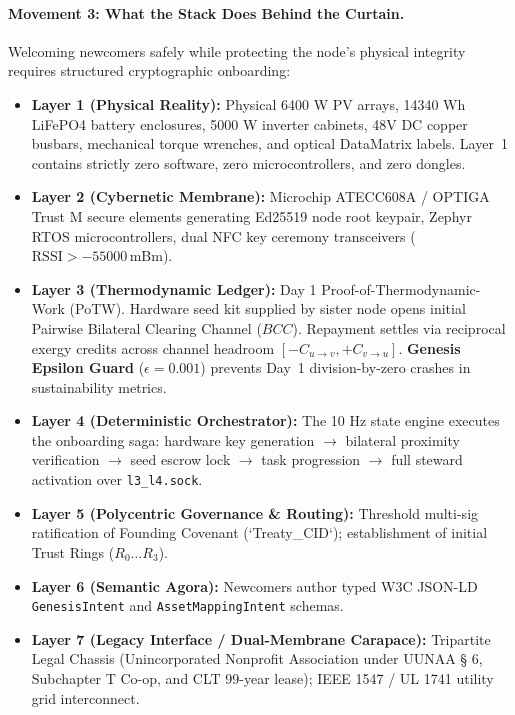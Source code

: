 \paragraph{Movement 3: What the Stack Does Behind the Curtain.}
Welcoming newcomers safely while protecting the node's physical integrity requires structured cryptographic onboarding:
\begin{itemize}
    \item \textbf{Layer 1 (Physical Reality):} Physical 6400 W PV arrays, 14340 Wh LiFePO4 battery enclosures, 5000 W inverter cabinets, 48V DC copper busbars, mechanical torque wrenches, and optical DataMatrix labels. Layer~1 contains strictly zero software, zero microcontrollers, and zero dongles.
    \item \textbf{Layer 2 (Cybernetic Membrane):} Microchip ATECC608A / OPTIGA Trust M secure elements generating Ed25519 node root keypair, Zephyr RTOS microcontrollers, dual NFC key ceremony transceivers ($\mathrm{RSSI} > -55000\,\mathrm{mBm}$).
    \item \textbf{Layer 3 (Thermodynamic Ledger):} Day 1 Proof-of-Thermodynamic-Work (PoTW). Hardware seed kit supplied by sister node opens initial Pairwise Bilateral Clearing Channel ($BCC$). Repayment settles via reciprocal exergy credits across channel headroom $[-C_{u \to v}, +C_{v \to u}]$. \textbf{Genesis Epsilon Guard} ($\epsilon = 0.001$) prevents Day~1 division-by-zero crashes in sustainability metrics.
    \item \textbf{Layer 4 (Deterministic Orchestrator):} The 10 Hz state engine executes the onboarding saga: hardware key generation $\to$ bilateral proximity verification $\to$ seed escrow lock $\to$ task progression $\to$ full steward activation over \texttt{l3\_l4.sock}.
    \item \textbf{Layer 5 (Polycentric Governance \& Routing):} Threshold multi-sig ratification of Founding Covenant (`Treaty\_CID`); establishment of initial Trust Rings ($R_0 \dots R_3$).
    \item \textbf{Layer 6 (Semantic Agora):} Newcomers author typed W3C JSON-LD \texttt{GenesisIntent} and \texttt{AssetMappingIntent} schemas.
    \item \textbf{Layer 7 (Legacy Interface / Dual-Membrane Carapace):} Tripartite Legal Chassis (Unincorporated Nonprofit Association under UUNAA § 6, Subchapter T Co-op, and CLT 99-year lease); IEEE 1547 / UL 1741 utility grid interconnect.
\end{itemize}

